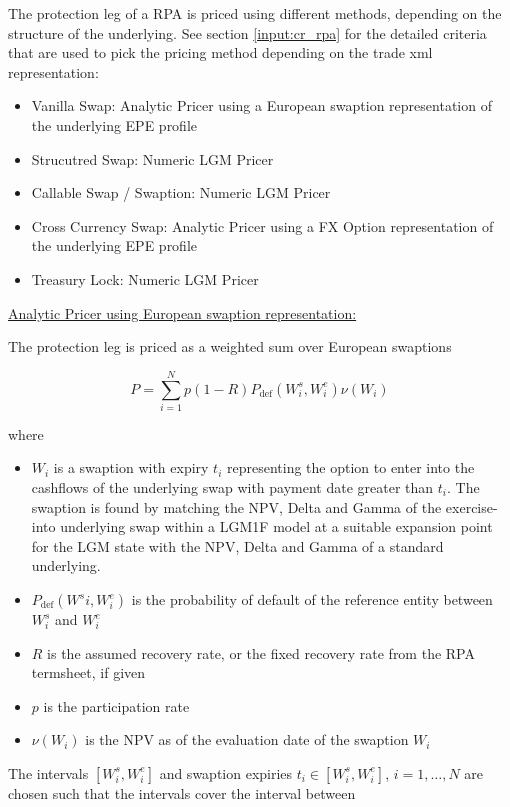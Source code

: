 The protection leg of a RPA is priced using different methods, depending on the structure of the underlying. See section
\ref{input:cr_rpa} for the detailed criteria that are used to pick the pricing method depending on the trade xml
representation:

\begin{itemize}
\item Vanilla Swap: Analytic Pricer using a European swaption representation of the underlying EPE profile
\item Strucutred Swap: Numeric LGM Pricer
\item Callable Swap / Swaption: Numeric LGM Pricer
\item Cross Currency Swap: Analytic Pricer using a FX Option representation of the underlying EPE profile
\item Treasury Lock: Numeric LGM Pricer
\end{itemize}

\underline{Analytic Pricer using European swaption representation:}

The protection leg is priced as a weighted sum over European swaptions

\begin{equation}
P = \sum_{i=1}^{N} p (1-R) P_{\text{def}}(W^s_i,W^e_i) \nu(W_i)
\end{equation}

where

\begin{itemize}
\item $W_i$ is a swaption with expiry $t_i$ representing the option to enter into the cashflows of the underlying swap
  with payment date greater than $t_i$. The swaption is found by matching the NPV, Delta and Gamma of the exercise-into
  underlying swap within a LGM1F model at a suitable expansion point for the LGM state with the NPV, Delta and Gamma of
  a standard underlying.
\item $P_{\text{def}}(W^si, W^e_i)$ is the probability of default of the reference entity between $W^s_i$ and $W^e_i$
\item $R$ is the assumed recovery rate, or the fixed recovery rate from the RPA termsheet, if given
\item $p$ is the participation rate
\item $\nu(W_i)$ is the NPV as of the evaluation date of the swaption $W_i$
\end{itemize}

The intervals $[W^s_i, W^e_i]$ and swaption expiries $t_i \in [W^s_i, W^e_i]$, $i=1,\ldots,N$ are chosen such that the
intervals cover the interval between

